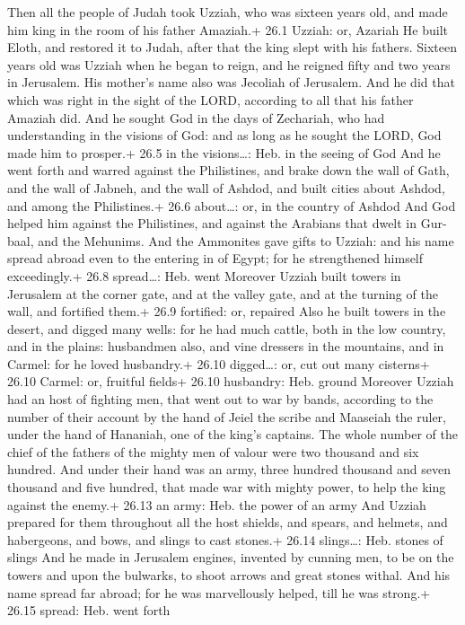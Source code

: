  Then all the people of Judah took Uzziah, who was sixteen
years old, and made him king in the room of his father Amaziah.+ 26.1
Uzziah: or, Azariah  He built Eloth, and restored it to
Judah, after that the king slept with his fathers.  Sixteen
years old was Uzziah when he began to reign, and he reigned fifty and
two years in Jerusalem. His mother's name also was Jecoliah of
Jerusalem.  And he did that which was right in the sight of
the LORD, according to all that his father Amaziah did.  And
he sought God in the days of Zechariah, who had understanding in the
visions of God: and as long as he sought the LORD, God made him to
prosper.+ 26.5 in the visions\ldots: Heb. in the seeing of God
 And he went forth and warred against the Philistines, and
brake down the wall of Gath, and the wall of Jabneh, and the wall of
Ashdod, and built cities about Ashdod, and among the Philistines.+ 26.6
about\ldots: or, in the country of Ashdod  And God helped
him against the Philistines, and against the Arabians that dwelt in
Gur-baal, and the Mehunims.  And the Ammonites gave gifts to
Uzziah: and his name spread abroad even to the entering in of Egypt; for
he strengthened himself exceedingly.+ 26.8 spread\ldots: Heb. went
 Moreover Uzziah built towers in Jerusalem at the corner
gate, and at the valley gate, and at the turning of the wall, and
fortified them.+ 26.9 fortified: or, repaired  Also he
built towers in the desert, and digged many wells: for he had much
cattle, both in the low country, and in the plains: husbandmen also, and
vine dressers in the mountains, and in Carmel: for he loved husbandry.+
26.10 digged\ldots: or, cut out many cisterns+ 26.10 Carmel: or,
fruitful fields+ 26.10 husbandry: Heb. ground  Moreover
Uzziah had an host of fighting men, that went out to war by bands,
according to the number of their account by the hand of Jeiel the scribe
and Maaseiah the ruler, under the hand of Hananiah, one of the king's
captains.  The whole number of the chief of the fathers of
the mighty men of valour were two thousand and six hundred.
 And under their hand was an army, three hundred thousand
and seven thousand and five hundred, that made war with mighty power, to
help the king against the enemy.+ 26.13 an army: Heb. the power of an
army  And Uzziah prepared for them throughout all the host
shields, and spears, and helmets, and habergeons, and bows, and slings
to cast stones.+ 26.14 slings\ldots: Heb. stones of slings 
And he made in Jerusalem engines, invented by cunning men, to be on the
towers and upon the bulwarks, to shoot arrows and great stones withal.
And his name spread far abroad; for he was marvellously helped, till he
was strong.+ 26.15 spread: Heb. went forth

